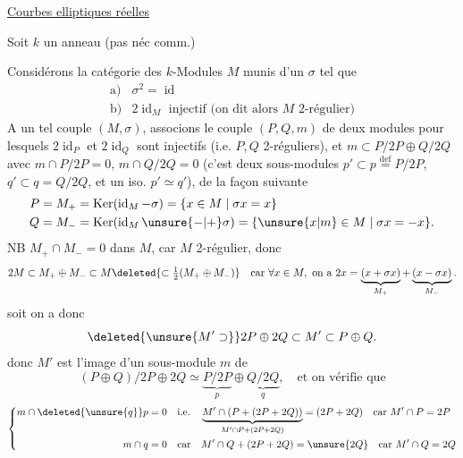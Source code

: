 \uline{Courbes elliptiques réelles}

Soit $k$ un anneau (pas néc comm.)

Considérons la catégorie des $k$-Modules
$M$ munis d'un  $\sigma$ 
tel que
\[
\begin{array}{ll}
\text{a)}&\sigma^2=\operatorname{id}\\
\text{b)}&2\operatorname{id}_M\text{ injectif (on dit alors }M\text{ 2-régulier)}
\end{array}
\]
A un tel couple $(M,\sigma)$,  associons le couple
$(P,Q,m)$ de deux modules pour lesquels $2\operatorname{id}_P$ et $2\operatorname{id}_Q$
sont injectifs (i.e. $P,Q$ 2-réguliers), et
$m\subset P/2P\oplus Q/2Q$  avec
$m\cap P/2P=0$, $m\cap Q/2Q=0$
(c'est deux sous-modules $p'\subset p\overset{\mathrm{def}}=P/2P$, $q'\subset q=Q/2Q$,
et un iso. $p'\simeq q'$), de la façon suivante
\[
\begin{aligned}
P=M_+&=\operatorname{Ker}(\operatorname{id}_M-\sigma)=\{x\in M\mid\sigma x=x\}\\
Q=M_-&=\operatorname{Ker}(\operatorname{id}_M\unsure{-|+}\sigma)=\{\unsure{x|m}\in M\mid\sigma x=-x\}.
\end{aligned}
\]
NB $M_+\cap M_-=0$ dans $M$, car $M$ 2-régulier, donc
\margin{!}
\[
2M\subset M_+\oplus M_-\subset M\deleted{\subset\tfrac12(M_+\oplus M_-)}
\quad\text{car }\forall x\in M,\text{ on a }2x=\underbrace{(x+\sigma x)}_{M_+}+\underbrace{(x-\sigma x)}_{M_-}.
\]
soit
on a donc
\[
\deleted{\unsure{M'\supset}}2P\oplus2Q\subset M'\subset P\oplus Q.
\]
donc $M'$ est l'image d'un sous-module $m$ de
\[
(P\oplus Q)/2P\oplus2Q\simeq\underbrace{P/2P}_p\oplus\underbrace{Q/2Q}_q,
\quad\text{et on vérifie que}
\]
\[
\left\{\begin{aligned}
m\cap\deleted{\unsure{q}}p&=0\quad\text{i.e.}\quad
\underbrace{M'\cap(P+(2P+2Q))}_{M'\cap P+(2P+2Q)}=(2P+2Q)\quad\text{car }M'\cap P=2P\\
m\cap q&=0\quad\text{car}\quad M'\cap Q+(2P+2Q)=\unsure{2Q}\quad\text{car }M'\cap Q=2Q
\end{aligned}\right.
\]

